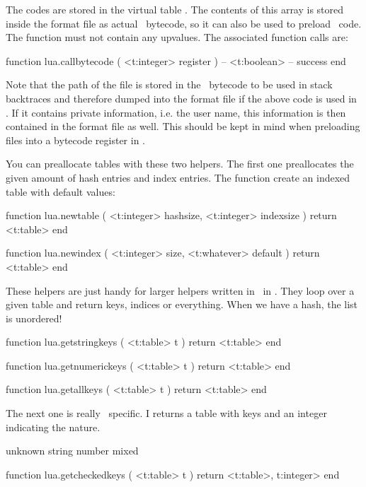 The codes are stored in the virtual table . The contents of
this array is stored inside the format file as actual \LUA\ bytecode, so it can
also be used to preload \LUA\ code. The function must not contain any upvalues.
The associated function calls are:

\starttyping[option=LUA]
function lua.callbytecode ( <t:integer> register )
    -- <t:boolean> -- success
end
\stoptyping

Note that the path of the file is stored in the \LUA\ bytecode to be used in
stack backtraces and therefore dumped into the format file if the above code is
used in \INITEX. If it contains private information, i.e. the user name, this
information is then contained in the format file as well. This should be kept in
mind when preloading files into a bytecode register in \INITEX.

\stopsubsection

\startsubsection[title=Tables]

You can preallocate tables with these two helpers. The first one preallocates the
given amount of hash entries and index entries. The  function
create an indexed table with default values:

\starttyping[option=LUA]
function lua.newtable ( <t:integer> hashsize, <t:integer> indexsize )
    return <t:table>
end

function lua.newindex ( <t:integer> size, <t:whatever> default )
    return <t:table>
end
\stoptyping

These helpers are just handy for larger helpers written in \LUA\ in \CONTEXT.
They loop over a given table and return keys, indices or everything. When we have
a hash, the list is unordered!

\starttyping[option=LUA]
function lua.getstringkeys ( <t:table> t )
    return <t:table>
end

function lua.getnumerickeys ( <t:table> t )
    return <t:table>
end

function lua.getallkeys ( <t:table> t )
    return <t:table>
end
\stoptyping

The next one is really \CONTEXT\ specific. I returns a table with keys and
an integer indicating the nature.

\startcolumns[n=4]
\starttabulate[|T|l|]
 \NC unknown \NC \NR
{} \NC string  \NC \NR
{} \NC number  \NC \NR
{} \NC mixed   \NC \NR
\stoptabulate
\stopcolumns

\starttyping[option=LUA]
function lua.getcheckedkeys ( <t:table> t )
    return <t:table>, t:integer>
end
\stoptyping

